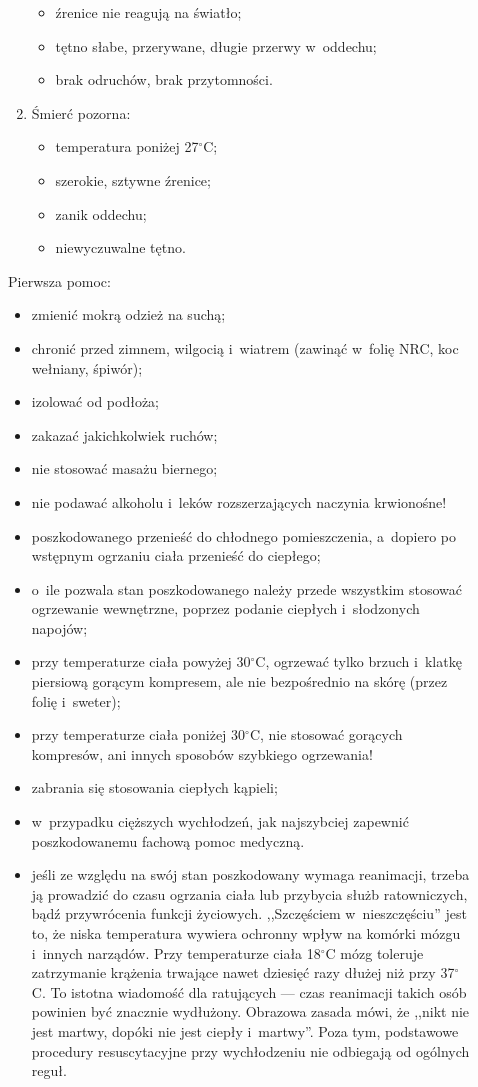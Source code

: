 \documentclass[a5paper,10pt,titlepage,twoside]{article}
\begin{document}
\begin{description}
\begin{enumerate}
\begin{itemize}
\item źrenice nie reagują na światło;
\item tętno słabe, przerywane, długie przerwy w~oddechu;
\item brak odruchów, brak przytomności.
\end{itemize}
\item Śmierć pozorna:
\begin{itemize}
\item temperatura poniżej 27$^\circ$C;
\item szerokie, sztywne źrenice;
\item zanik oddechu;
\item niewyczuwalne tętno.
\end{itemize}
\end{enumerate}

Pierwsza pomoc:
\begin{itemize}
\item zmienić mokrą odzież na suchą;
\item chronić przed zimnem, wilgocią i~wiatrem (zawinąć w~folię NRC, koc wełniany, śpiwór);
\item izolować od podłoża;
\item zakazać jakichkolwiek ruchów;
\item nie stosować masażu biernego;
\item nie podawać alkoholu i~leków rozszerzających naczynia krwionośne!
\item poszkodowanego przenieść do chłodnego pomieszczenia, a~dopiero po wstępnym ogrzaniu ciała przenieść do ciepłego;
\item o~ile pozwala stan poszkodowanego należy przede wszystkim stosować ogrzewanie wewnętrzne, poprzez podanie ciepłych i~słodzonych napojów;
\item przy temperaturze ciała powyżej 30$^\circ$C, ogrzewać tylko brzuch i~klatkę piersiową gorącym kompresem, ale nie bezpośrednio na skórę (przez folię i~sweter);
\item przy temperaturze ciała poniżej 30$^\circ$C, nie stosować gorących kompresów, ani innych sposobów szybkiego ogrzewania!
\item zabrania się stosowania ciepłych kąpieli;
\item w~przypadku cięższych wychłodzeń, jak najszybciej zapewnić poszkodowanemu fachową pomoc medyczną.
\item jeśli ze względu na swój stan poszkodowany wymaga reanimacji, trzeba ją prowadzić do czasu ogrzania ciała lub przybycia służb ratowniczych, bądź przywrócenia funkcji życiowych. ,,Szczęściem w~nieszczęściu'' jest to, że niska temperatura wywiera ochronny wpływ na komórki mózgu i~innych narządów. Przy temperaturze ciała 18$^\circ$C mózg toleruje zatrzymanie krążenia trwające nawet dziesięć razy dłużej niż przy 37$^\circ$C. To istotna wiadomość dla ratujących  --- czas reanimacji takich osób powinien być znacznie wydłużony. Obrazowa zasada mówi, że ,,nikt nie jest martwy, dopóki nie jest ciepły i~martwy''. Poza tym, podstawowe procedury resuscytacyjne przy wychłodzeniu nie odbiegają od ogólnych reguł. %

\end{itemize}
\end{description}
\end{document}

